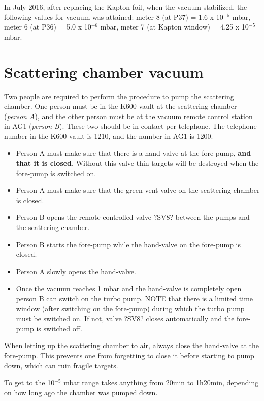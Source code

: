 \documentclass[11pt]{report}
\begin{document}
In July 2016, after replacing the Kapton foil, when the vacuum stabilized, the following values for vacuum was attained:
meter 8 (at P37) = 1.6 x 10$^{-5}$ mbar,
meter 6 (at P36) = 5.0 x 10$^{-6}$ mbar,
meter 7 (at Kapton window) = 4.25 x 10$^{-5}$ mbar.


\section{Scattering chamber vacuum}\label{sec:Scattering-Chamber-Vacuum}


Two people are required to perform the procedure to pump the scattering chamber.
One person must be in the K600 vault at the scattering chamber ({\it person A}), 
 and the other person must be at the vacuum remote control station in AG1 ({\it person B}). These two should be in contact per telephone. The telephone number in the K600 vault is 1210, and the number in AG1 is 1200. 

\begin{itemize}
\item Person A must make sure that there is a hand-valve at the fore-pump, {\bf and that it is closed}. Without this valve thin targets will be destroyed when the fore-pump is switched on.
\item Person A must make sure that the green vent-valve on the scattering chamber is closed.
\item Person B opens the remote controlled valve ?SV8? between the pumps and the scattering chamber.
\item Person B starts the fore-pump while the hand-valve on the fore-pump is closed.
\item Person A slowly opens the hand-valve. 
\item Once the vacuum reaches 1 mbar and the hand-valve is completely open person B can switch on the turbo pump. NOTE that there is a limited time window (after switching on the fore-pump) during which the turbo pump must be switched on. If not, valve ?SV8? closes automatically and the fore-pump is switched off.  
\end{itemize}

When letting up the scattering chamber to air, always close the hand-valve at the fore-pump. 
This prevents one from forgetting to close it before starting to pump down,
which can ruin fragile targets.

To get to the 10$^{-5}$ mbar range takes anything from 20min to 1h20min,
depending on how long ago the chamber was pumped down.
\end{document}
